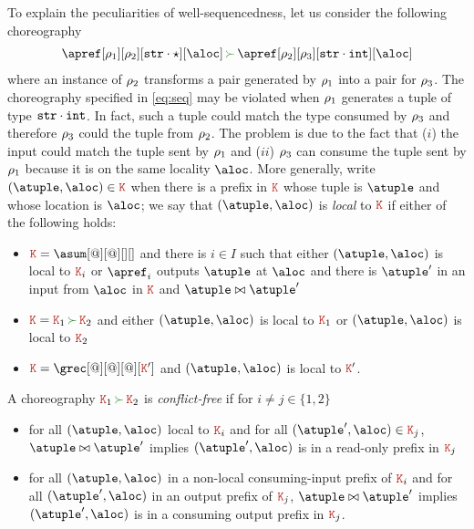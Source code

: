 To explain the peculiarities of well-sequencedness, let us consider
the following choreography
\begin{align}\label{eq:seq}
  \apref[\arole_1][\arole_2][{\asort[str] \cdot \wildcard}][\aloc] \seqop
  \apref[\arole_2][\arole_3][{\asort[str] \cdot \asort[int]}][\aloc]
\end{align}
%
where an instance of $\arole_2$ transforms a pair generated by
$\arole_1$ into a pair for $\arole_3$.
%
The choreography specified in \eqref{eq:seq} may be violated when
$\arole_1$ generates a tuple of type $\asort[str] \cdot \asort[int]$.
%
In fact, such a tuple could match the type consumed by $\arole_3$ and
therefore $\arole_3$ could  the tuple from $\arole_2$.
%
The problem is due to the fact that ($i$) the input could match the
tuple sent by $\arole_1$ and ($ii$) $\arole_3$ can consume the tuple
sent by $\arole_1$ because it is on the same locality $\aloc$.
%
More generally, write $(\atuple, \aloc) \in \aK$ when there is a
prefix in $\aK$ whose tuple is $\atuple$ and whose location is
$\aloc$; we say that $(\atuple, \aloc)$ is \emph{local} to $\aK$ if
either of the following holds:
\begin{itemize}
\item $\aK = \asum[@][@][][]$ and there is $i \in I$ such that either
  $(\atuple, \aloc)$ is local to $\aK_i$ or $\apref_i$ outputs
  $\atuple$ at $\aloc$ and there is $\atuple'$ in an input from
  $\aloc$ in $\aK$ and $\atuple \matches \atuple'$
\item $\aK = \aK_1 \seqop \aK_2$ and either $(\atuple, \aloc)$ is local to
  $\aK_1$ or   $(\atuple, \aloc)$ is local to $\aK_2$
\item $\aK = \grec[@][@][@][\aK']$ and $(\atuple, \aloc)$ is local to
  $\aK'$.
\end{itemize}
%
A choreography $\aK_1 \seqop \aK_2$ is \emph{conflict-free} if for
$i \neq j \in \{1,2\}$
%
\begin{itemize}
\item for all $(\atuple,\aloc)$ local to $\aK_i$ and for all
  $(\atuple', \aloc) \in \aK_j$, $\atuple \matches \atuple'$ implies
  $(\atuple', \aloc)$ is in a read-only prefix in $\aK_j$
\item for all $(\atuple,\aloc)$ in a non-local consuming-input prefix
  of $\aK_i$ and for all $(\atuple', \aloc)$ in an output prefix of
  $\aK_j$, $\atuple \matches \atuple'$ implies $(\atuple',\aloc)$ is
  in a consuming output prefix in $\aK_j$.
\end{itemize}

